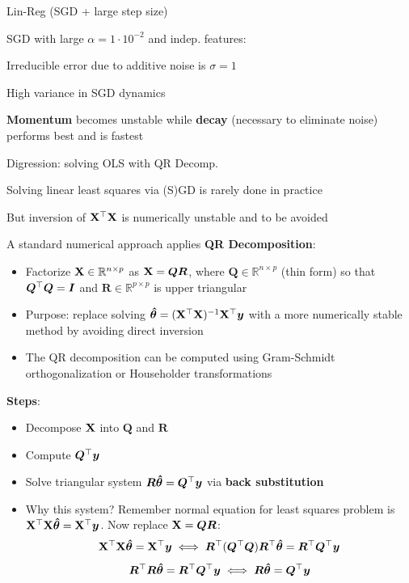 \documentclass[11pt,compress,t,notes=noshow, xcolor=table]{beamer}
\begin{document}
\begin{framei}[fs=small]{Lin-Reg (SGD + large step size)}
\item SGD with large $\alpha=1 \cdot 10^{-2}$ and indep. features:
\item Irreducible error due to additive noise is $\sigma=1$
\item High variance in SGD dynamics
\item \textbf{Momentum} becomes unstable while \textbf{decay} (necessary to eliminate noise) performs best and is fastest
\end{framei}


\begin{framei}[fs=footnotesize]{Digression: solving OLS with QR Decomp.}
\item Solving linear least squares via (S)GD is rarely done in practice
\item But inversion of $\mathbf{X}^{\top}\mathbf{X}$ is numerically unstable and to be avoided
\item A standard numerical approach applies \textbf{QR Decomposition}:
\begin{itemize}
\item Factorize \( \mathbf{X} \in \mathbb{R}^{n \times p} \) as \( \mathbf{X} = \bm{Q}\bm{R} \), where \( \bm{Q} \in \mathbb{R}^{n \times p} \) (thin form) so that $\bm{Q}^{\top}\bm{Q}=\bm{I}$ and \( \bm{R} \in \mathbb{R}^{p \times p} \) is upper triangular
\item Purpose: replace solving \( \bm{\hat\theta} = (\mathbf{X}^{\top} \mathbf{X})^{-1} \mathbf{X}^{\top} \bm{y} \) with a more numerically stable method by avoiding direct inversion
\item The QR decomposition can be computed using Gram-Schmidt orthogonalization or Householder transformations
\end{itemize}
\item \textbf{Steps}:
\begin{itemize}
\item Decompose \( \mathbf{X} \) into \( \bm{Q} \) and \( \bm{R} \)
\item Compute \( \bm{Q}^{\top} \bm{y} \)
\item Solve triangular system \( \bm{R} \bm{\hat\theta} = \bm{Q}^{\top} \bm{y} \) via \textbf{back substitution}
\vfill
\item Why this system? Remember normal equation for least squares problem is $\mathbf{X}^{\top}\mathbf{X} \bm{\hat\theta} = \mathbf{X}^{\top}\bm{y}$. Now replace $\mathbf{X}=\bm{Q} \bm{R}$:
$$
\mathbf{X}^{\top}\mathbf{X} \bm{\hat\theta} = \mathbf{X}^{\top}\bm{y} \iff \bm{R}^{\top}(\bm{Q}^{\top} \bm{Q}) \bm{R}^{\top} \bm{\hat\theta} = \bm{R}^{\top} \bm{Q}^{\top} \bm{y}
$$
$$
\bm{R}^{\top}\bm{R} \bm{\hat\theta} = \bm{R}^{\top} \bm{Q}^{\top} \bm{y} \iff \bm{R} \bm{\hat\theta} = \bm{Q}^{\top} \bm{y}
$$
\end{itemize}
\end{framei}
\end{document}
